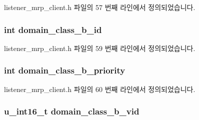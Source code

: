 listener\+\_\+mrp\+\_\+client.\+h 파일의 57 번째 라인에서 정의되었습니다.

\subsubsection[{\texorpdfstring{domain\+\_\+class\+\_\+b\+\_\+id}{domain_class_b_id}}]{\setlength{\rightskip}{0pt plus 5cm}int domain\+\_\+class\+\_\+b\+\_\+id}\hypertarget{structmrp__listener__ctx_a058aabd498c78e32b6610fd06f90fc43}{}\label{structmrp__listener__ctx_a058aabd498c78e32b6610fd06f90fc43}


listener\+\_\+mrp\+\_\+client.\+h 파일의 59 번째 라인에서 정의되었습니다.

\subsubsection[{\texorpdfstring{domain\+\_\+class\+\_\+b\+\_\+priority}{domain_class_b_priority}}]{\setlength{\rightskip}{0pt plus 5cm}int domain\+\_\+class\+\_\+b\+\_\+priority}\hypertarget{structmrp__listener__ctx_a90efafdfc3b16f51cc0f67aa65796a3c}{}\label{structmrp__listener__ctx_a90efafdfc3b16f51cc0f67aa65796a3c}


listener\+\_\+mrp\+\_\+client.\+h 파일의 60 번째 라인에서 정의되었습니다.

\subsubsection[{\texorpdfstring{domain\+\_\+class\+\_\+b\+\_\+vid}{domain_class_b_vid}}]{\setlength{\rightskip}{0pt plus 5cm}u\+\_\+int16\+\_\+t domain\+\_\+class\+\_\+b\+\_\+vid}\hypertarget{structmrp__listener__ctx_a153312a7212b932f60b49a67309f2053}{}\label{structmrp__listener__ctx_a153312a7212b932f60b49a67309f2053}


